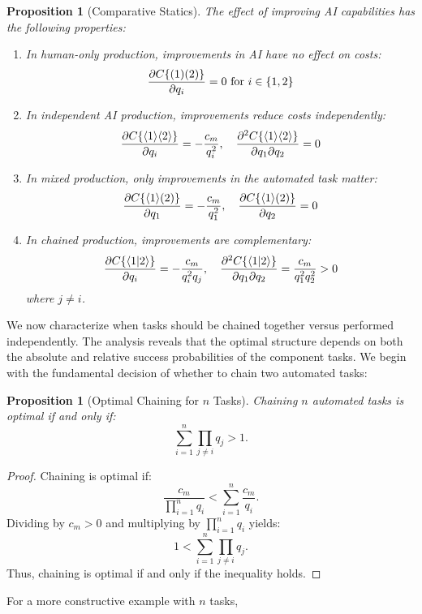 \documentclass{article}
\newtheorem{proposition}[theorem]{Proposition}
\begin{document}
\begin{proposition}[Comparative Statics]
The effect of improving AI capabilities has the following properties:
\begin{enumerate}
\item In human-only production, improvements in AI have no effect on costs:
\[\frac{\partial C\{ ( 1 )( 2 ) \}}{\partial q_i} = 0 \text{ for } i \in \{1,2\}\]
\item In independent AI production, improvements reduce costs independently:
\[\frac{\partial C\{ \langle 1 \rangle\langle 2 \rangle \}}{\partial q_i} = -\frac{c_m}{q_i^2}, \quad \frac{\partial^2 C\{ \langle 1 \rangle\langle 2 \rangle \}}{\partial q_1 \partial q_2} = 0\]
\item In mixed production, only improvements in the automated task matter:
\[\frac{\partial C\{ \langle 1 \rangle( 2 ) \}}{\partial q_1} = -\frac{c_m}{q_1^2}, \quad \frac{\partial C\{ \langle 1 \rangle( 2 ) \}}{\partial q_2} = 0\]
\item In chained production, improvements are complementary:
\[\frac{\partial C\{ \langle 1|2 \rangle \}}{\partial q_i} = -\frac{c_m}{q_i^2q_j}, \quad \frac{\partial^2 C\{ \langle 1|2 \rangle \}}{\partial q_1 \partial q_2} = \frac{c_m}{q_1^2q_2^2} > 0\]
where $j \neq i$.
\end{enumerate}
\end{proposition}

We now characterize when tasks should be chained together versus performed independently.
The analysis reveals that the optimal structure depends on both the absolute and relative success probabilities of the component tasks.
We begin with the fundamental decision of whether to chain two automated tasks:

\begin{proposition}[Optimal Chaining for \(n\) Tasks]
  Chaining \(n\) automated tasks is optimal if and only if:
  \[
  \sum_{i=1}^n \prod_{j \neq i} q_j > 1.
  \]
  \end{proposition}
  
  \begin{proof}
  Chaining is optimal if:
  \[
  \frac{c_m}{\prod_{i=1}^n q_i} < \sum_{i=1}^n \frac{c_m}{q_i}.
  \]
  Dividing by \(c_m > 0\) and multiplying by \(\prod_{i=1}^n q_i\) yields:
  \[
  1 < \sum_{i=1}^n \prod_{j \neq i} q_j.
  \]
  Thus, chaining is optimal if and only if the inequality holds.
  \end{proof}

For a more constructive example with $n$ tasks, 
\end{document}

